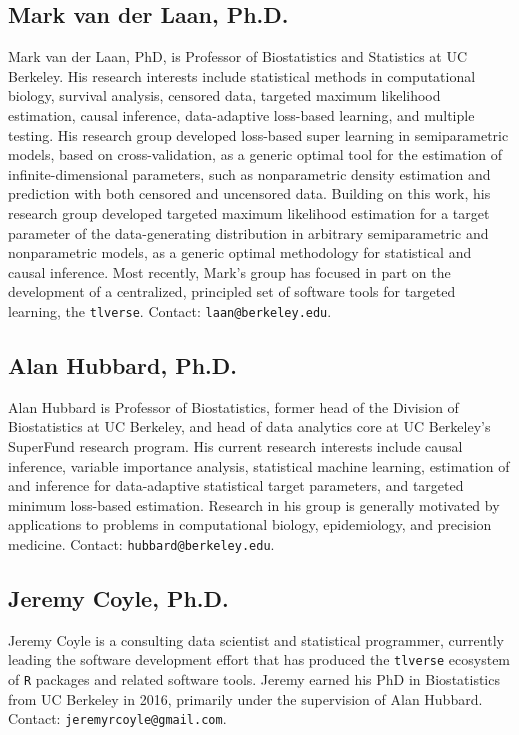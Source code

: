 \documentclass[a4paper,11pt]{texMemo}
\begin{document}
\subsection{Mark van der Laan, Ph.D.}

Mark van der Laan, PhD, is Professor of Biostatistics and Statistics at UC
Berkeley. His research interests include statistical methods in computational
biology, survival analysis, censored data, targeted maximum likelihood
estimation, causal inference, data-adaptive loss-based learning, and multiple
testing. His research group developed loss-based super learning in
semiparametric models, based on cross-validation, as a generic optimal tool for
the estimation of infinite-dimensional parameters, such as nonparametric density
estimation and prediction with both censored and uncensored data. Building on
this work, his research group developed targeted maximum likelihood estimation
for a target parameter of the data-generating distribution in arbitrary
semiparametric and nonparametric models, as a generic optimal methodology for
statistical and causal inference. Most recently, Mark's group has focused in
part on the development of a centralized, principled set of software tools for
targeted learning, the \texttt{tlverse}. Contact: \texttt{laan@berkeley.edu}.

\subsection{Alan Hubbard, Ph.D.}

Alan Hubbard is Professor of Biostatistics, former head of the Division of
Biostatistics at UC Berkeley, and head of data analytics core at UC Berkeley's
SuperFund research program. His current research interests include causal
inference, variable importance analysis, statistical machine learning,
estimation of and inference for data-adaptive statistical target parameters, and
targeted minimum loss-based estimation. Research in his group is generally
motivated by applications to problems in computational biology, epidemiology,
and precision medicine. Contact: \texttt{hubbard@berkeley.edu}.

\subsection{Jeremy Coyle, Ph.D.}

Jeremy Coyle is a consulting data scientist and statistical programmer,
currently leading the software development effort that has produced the
\texttt{tlverse} ecosystem of \texttt{R} packages and related software tools.
Jeremy earned his PhD in Biostatistics from UC Berkeley in 2016, primarily under
the supervision of Alan Hubbard. Contact: \texttt{jeremyrcoyle@gmail.com}.
\end{document}
